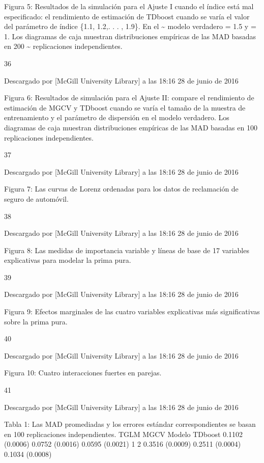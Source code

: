 \documentclass[]{article}
\begin{document}
Figura 5: Resultados de la simulación para el Ajuste I cuando el índice
está mal especificado: el rendimiento de estimación de TDboost cuando se
varía el valor del parámetro de índice \{1.1, 1.2,. . . , 1.9\}. En el
\textasciitilde{} modelo verdadero = 1.5 y = 1. Los diagramas de caja
muestran distribuciones empíricas de las MAD basadas en 200
\textasciitilde{} replicaciones independientes.

36



Descargado por {[}McGill University Library{]} a las 18:16 28 de junio
de 2016

Figura 6: Resultados de simulación para el Ajuste II: compare el
rendimiento de estimación de MGCV y TDboost cuando se varía el tamaño de
la muestra de entrenamiento y el parámetro de dispersión en el modelo
verdadero. Los diagramas de caja muestran distribuciones empíricas de
las MAD basadas en 100 replicaciones independientes.

37



Descargado por {[}McGill University Library{]} a las 18:16 28 de junio
de 2016

Figura 7: Las curvas de Lorenz ordenadas para los datos de reclamación
de seguro de automóvil.

38



Descargado por {[}McGill University Library{]} a las 18:16 28 de junio
de 2016

Figura 8: Las medidas de importancia variable y líneas de base de 17
variables explicativas para modelar la prima pura.

39



Descargado por {[}McGill University Library{]} a las 18:16 28 de junio
de 2016

Figura 9: Efectos marginales de las cuatro variables explicativas más
significativas sobre la prima pura.

40



Descargado por {[}McGill University Library{]} a las 18:16 28 de junio
de 2016

Figura 10: Cuatro interacciones fuertes en parejas.

41



Descargado por {[}McGill University Library{]} a las 18:16 28 de junio
de 2016

Tabla 1: Las MAD promediadas y los errores estándar correspondientes se
basan en 100 replicaciones independientes. TGLM MGCV Modelo TDboost
0.1102 (0.0006) 0.0752 (0.0016) 0.0595 (0.0021) 1 2 0.3516 (0.0009)
0.2511 (0.0004) 0.1034 (0.0008)
\end{document}
